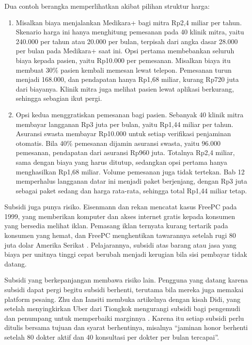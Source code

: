 Dua contoh berangka memperlihatkan akibat pilihan struktur harga:
\begin{enumerate}
  \item Misalkan biaya menjalankan Medikara+ bagi mitra Rp2,4 miliar per tahun.
        Skenario harga ini hanya menghitung pemesanan pada 40 klinik mitra, yaitu
        240.000 per tahun atau 20.000 per bulan, terpisah dari angka dasar 28.000
        per bulan pada Medikara+ saat ini. Opsi pertama membebankan
        seluruh biaya kepada pasien, yaitu Rp10.000 per pemesanan. Misalkan
        biaya itu membuat 30\% pasien kembali memesan lewat telepon. Pemesanan
        turun menjadi 168.000, dan pendapatan hanya Rp1,68 miliar, kurang
        Rp720 juta dari biayanya. Klinik mitra juga melihat pasien lewat
        aplikasi berkurang, sehingga sebagian ikut pergi.
  \item Opsi kedua menggratiskan pemesanan bagi pasien. Sebanyak 40 klinik
        mitra membayar langganan Rp3 juta per bulan, yaitu Rp1,44 miliar per
        tahun. Asuransi swasta membayar Rp10.000 untuk setiap verifikasi
        penjaminan otomatis. Bila 40\% pemesanan dijamin asuransi swasta, yaitu
        96.000 pemesanan, pendapatan dari asuransi Rp960 juta. Totalnya Rp2,4
        miliar, sama dengan biaya yang harus ditutup, sedangkan opsi pertama hanya
        menghasilkan Rp1,68 miliar. Volume pemesanan juga tidak tertekan. Bab 12
        memperhalus langganan datar ini menjadi paket berjenjang, dengan Rp3 juta
        sebagai paket sedang dan harga rata-rata, sehingga total Rp1,44 miliar
        tetap.
\end{enumerate}

Subsidi juga punya risiko. Eisenmann dan rekan mencatat kasus FreePC pada 1999,
yang memberikan komputer dan akses internet gratis kepada konsumen yang
bersedia melihat iklan. Pemasang iklan ternyata kurang tertarik pada konsumen
yang hemat, dan FreePC menghentikan tawarannya setelah rugi 80 juta
dolar Amerika Serikat \cite{eisenmann2006strategies}. Pelajarannya, subsidi
atas barang atau jasa yang biaya per unitnya tinggi cepat berubah menjadi
kerugian bila sisi pembayar tidak datang.

Subsidi yang berkepanjangan membawa risiko lain. Pengguna yang datang karena
subsidi dapat pergi begitu subsidi berhenti, terutama bila mereka juga memakai
platform pesaing. Zhu dan Iansiti membuka artikelnya dengan kisah Didi, yang
setelah menyingkirkan Uber dari Tiongkok mengurangi subsidi bagi pengemudi dan
penumpang untuk memperbaiki marginnya \cite{c02-zhu2019platforms}. Karena itu
setiap subsidi perlu ditulis bersama tujuan dan syarat berhentinya, misalnya
``jaminan honor berhenti setelah 80 dokter aktif dan 40 konsultasi per dokter
per bulan tercapai''.

